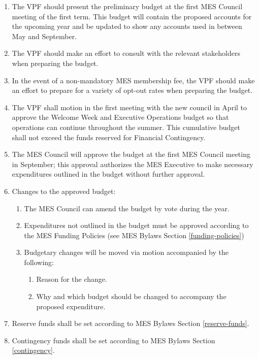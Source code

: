 \begin{enumerate}
 \item
  The VPF should present the preliminary budget at the first MES Council
  meeting of the first term. This budget will contain the proposed
  accounts for the upcoming year and be updated to show any accounts
  used in between May and September.
 \item
  The VPF should make an effort to consult with the relevant
  stakeholders when preparing the budget.
 \item
  In the event of a non-mandatory MES membership fee, the VPF should
  make an effort to prepare for a variety of opt-out rates when
  preparing the budget.
 \item
  The VPF shall motion in the first meeting with the new council in
  April to approve the Welcome Week and Executive Operations budget so
  that operations can continue throughout the summer. This cumulative
  budget shall not exceed the funds reserved for Financial Contingency.
 \item
  The MES Council will approve the budget at the first MES Council
  meeting in September; this approval authorizes the MES Executive to
  make necessary expenditures outlined in the budget without further
  approval.
 \item
  Changes to the approved budget:

  \begin{enumerate}
   \item
    The MES Council can amend the budget by vote during the year.
   \item
    Expenditures not outlined in the budget must be approved according
    to the MES Funding Policies (see MES Bylaws Section \ref{funding-policies})
   \item
    Budgetary changes will be moved via motion accompanied by the
    following:

    \begin{enumerate}
     \item
      Reason for the change.
     \item
      Why and which budget should be changed to accompany the proposed
      expenditure.
    \end{enumerate}
  \end{enumerate}
 \item
  Reserve funds shall be set according to MES Bylaws Section \ref{reserve-funds}.
 \item
  Contingency funds shall be set according to MES Bylaws Section
  \ref{contingency}.

\end{enumerate}


